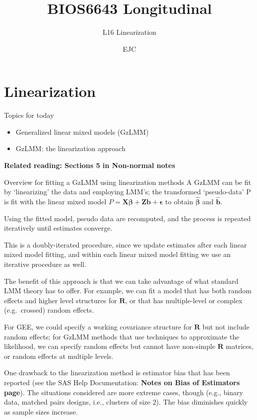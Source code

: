 \documentclass[
  9pt,
  ignorenonframetext,
]{beamer}
\title{BIOS6643 Longitudinal}
\subtitle{L16 Linearization}
\author{EJC}
\date{}
\institute{Department of Biostatistics \& Informatics}
\begin{document}
\frame{\titlepage}

\begin{frame}[allowframebreaks]
  \tableofcontents[hideallsubsections]
\end{frame}
\hypertarget{linearization}{%
\section{Linearization}\label{linearization}}

\begin{frame}{Topics for today}
\protect\hypertarget{topics-for-today}{}
\begin{itemize}
\item
  Generalized linear mixed models (GzLMM)
\item
  GzLMM: the linearization approach
\end{itemize}

\vspace{\baselineskip}

\textbf{Related reading: Sections 5 in Non-normal notes}
\end{frame}

\begin{frame}{Overview for fitting a GzLMM using linearization methods}
\protect\hypertarget{overview-for-fitting-a-gzlmm-using-linearization-methods}{}
A GzLMM can be fit by `linearizing' the data and employing LMM's; the
transformed `pseudo-data' P is fit with the linear mixed model
\(P=\pmb {X\beta} + \pmb {Zb} + \pmb {\epsilon}\) to obtain
\(\pmb {\hat \beta}\) and \(\pmb {\hat b}\).

Using the fitted model, pseudo data are recomputed, and the process is
repeated iteratively until estimates converge.

This is a doubly-iterated procedure, since we update estimates after
each linear mixed model fitting, and within each linear mixed model
fitting we use an iterative procedure as well.
\end{frame}

\begin{frame}{}
\protect\hypertarget{section}{}
The benefit of this approach is that we can take advantage of what
standard LMM theory has to offer. For example, we can fit a model that
has both random effects and higher level structures for \(\pmb R\), or
that has multiple-level or complex (e.g.~crossed) random effects.

For GEE, we could specify a working covariance structure for \(\pmb R\)
but not include random effects; for GzLMM methods that use techniques to
approximate the likelihood, we can specify random effects but cannot
have non-simple \(\pmb R\) matrices, or random effects at multiple
levels.

One drawback to the linearization method is estimator bias that has been
reported (see the SAS Help Documentation: \textbf{Notes on Bias of
Estimators page}). The situations considered are more extreme cases,
though (e.g., binary data, matched pairs designs, i.e., clusters of size
2). The bias diminishes quickly as sample sizes increase.
\end{frame}
\end{document}
